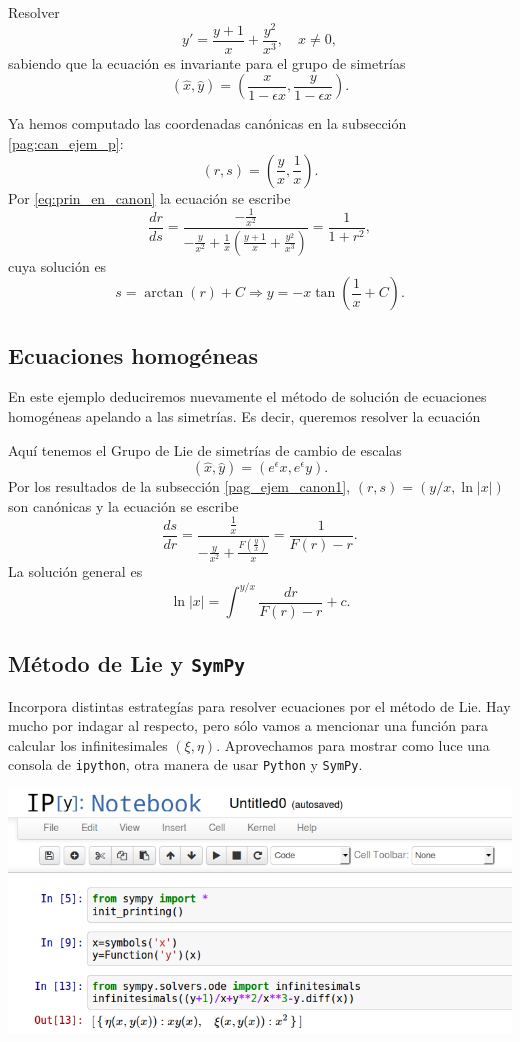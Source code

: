 \begin{ejemplo} Resolver
\[y'=\frac{y+1}{x}+\frac{y^2}{x^3},\quad x\neq 0,\]
sabiendo que la ecuación es invariante para el grupo de simetrías
\[(\hat{x},\hat{y})=\left(\frac{x}{1-\epsilon x},\frac{y}{1-\epsilon x}   \right).\]
\end{ejemplo}
Ya hemos computado las coordenadas canónicas en la subsección \ref{pag:can_ejem_p}:
\[(r,s)=\left(\frac{y}{x},\frac{1}{x}\right).\]
Por \eqref{eq:prin_en_canon} la ecuación se escribe
\[\frac{dr}{ds}=\frac{-\frac{1}{x^2} }{-\frac{y}{x^2}+\frac{1}{x}\left(
\frac{y+1}{x}+\frac{y^2}{x^3}\right)}=\frac{1}{1+r^2},\]
cuya solución es
\[s=\arctan(r)+C\Rightarrow y=-x\tan\left(\frac{1}{x}+C\right).\]



\subsection{Ecuaciones homogéneas}
\begin{ejemplo} En este ejemplo deduciremos nuevamente el método de solución de ecuaciones homogéneas apelando a las simetrías. Es decir, queremos resolver la ecuación
\end{ejemplo}
Aquí tenemos el Grupo de Lie de simetrías de cambio de escalas
\[(\hat{x},\hat{y})=(e^{\epsilon}x,e^{\epsilon}y).\] 
Por los resultados de la subsección \ref{pag_ejem_canon1}, $(r,s)=(y/x,\ln|x|)$ son canónicas y la ecuación se escribe
\[\frac{ds}{dr}=\frac{\frac{1}{x}}{-\frac{y}{x^2}+\frac{F\left(\frac{y}{x}\right)}{x}}=\frac{1}{F(r)-r}.\]
La solución general es 
\[\ln|x|=\int^{y/x}\frac{dr}{F(r)-r}+c.\]




\subsection{Método de Lie y \texttt{SymPy}}
 Incorpora distintas estrategías para resolver ecuaciones por el método de Lie. Hay mucho por indagar al respecto, pero sólo vamos a mencionar una función para calcular los infinitesimales $(\xi,\eta)$.  Aprovechamos para mostrar como luce una consola de \texttt{ipython}, otra manera de usar \texttt{Python} y \texttt{SymPy}.

\includegraphics[scale=.45]{imagenes/ipython.png}





%

